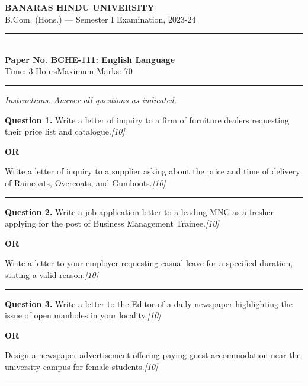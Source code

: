\documentclass[11pt,a4paper]{article}
\newcommand{\pts}[1]{\hfill   \textit{[#1]}}
\begin{document}
\begin{center}
  {\large\bfseries BANARAS HINDU UNIVERSITY}\\[2pt]
  {\normalsize B.Com. (Hons.) --- Semester I Examination, 2023-24}\\[6pt]
  \rule{0.8\linewidth}{0.5pt}\\[6pt]
  {\large\bfseries Paper No. BCHE-111: English Language}\\[4pt]
  {\normalsize Time: 3 Hours\hfill Maximum Marks: 70}
\end{center}

\rule{\linewidth}{0.4pt}

\smallskip



\noindent   \textit{Instructions: Answer all questions as indicated.}

\bigskip




\noindent   \textbf{Question 1.}
Write a letter of inquiry to a firm of furniture dealers requesting their price list and catalogue.\pts{10}

\centerline{   \textbf{OR}}

Write a letter of inquiry to a supplier asking about the price and time of delivery of Raincoats, Overcoats, and Gumboots.\pts{10}

\medskip\rule{\linewidth}{0.2pt}




\noindent   \textbf{Question 2.}
Write a job application letter to a leading MNC as a fresher applying for the post of Business Management Trainee.\pts{10}

\centerline{   \textbf{OR}}

Write a letter to your employer requesting casual leave for a specified duration, stating a valid reason.\pts{10}

\medskip\rule{\linewidth}{0.2pt}




\noindent   \textbf{Question 3.}
Write a letter to the Editor of a daily newspaper highlighting the issue of open manholes in your locality.\pts{10}

\centerline{   \textbf{OR}}

Design a newspaper advertisement offering paying guest accommodation near the university campus for female students.\pts{10}

\medskip\rule{\linewidth}{0.2pt}


\newpage
\end{document}
